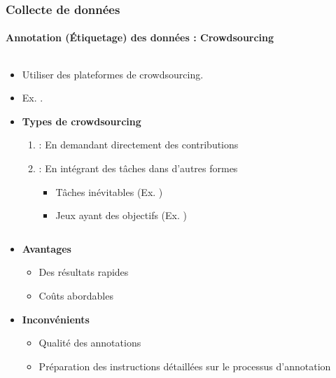 \documentclass[xcolor=table]{beamer}
\begin{document}
\begin{frame}
\frametitle{Collecte de données}
\framesubtitle{Annotation (Étiquetage) des données : Crowdsourcing}

\begin{columns}
\begin{column}{0.78\textwidth}
\begin{itemize}
	\item Utiliser des plateformes de crowdsourcing.
	\item Ex. .
	\item \textbf{Types de crowdsourcing}
	\begin{enumerate}
		\item {} : En demandant directement des contributions
		\item {} : En intégrant des tâches dans d’autres formes
		\begin{itemize}
			\item Tâches inévitables (Ex. )
			\item Jeux ayant des objectifs (Ex. )
		\end{itemize}
	\end{enumerate}
\end{itemize}
\end{column}
\begin{column}{0.22\textwidth}
\end{column}
\end{columns}

\begin{itemize}
	\item \textbf{Avantages} 
	\begin{itemize}
		\item Des résultats rapides
		\item Coûts abordables
	\end{itemize}
	\item \textbf{Inconvénients}
	\begin{itemize}
		\item Qualité des annotations
		\item Préparation des instructions détaillées sur le processus d'annotation
	\end{itemize}
\end{itemize}

\end{frame}
\end{document}
